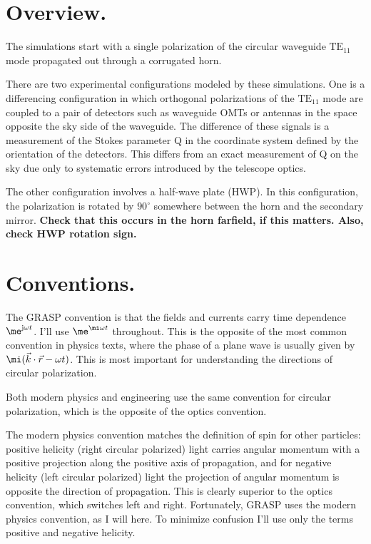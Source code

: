 \documentclass[10pt,english]{article}
\begin{document}
\section*{Overview.}

The simulations start with a single polarization of the circular waveguide $\text{TE}_{11}$ mode propagated out through a corrugated horn.

There are two experimental configurations modeled by these simulations. One is a differencing configuration in which orthogonal polarizations of the $\text{TE}_{11}$ mode are coupled to a pair of detectors such as waveguide OMTs or antennas in the space opposite the sky side of the waveguide. The difference of these signals is a measurement of the Stokes parameter Q in the coordinate system defined by the orientation of the detectors. This differs from an exact measurement of Q on the sky due only to systematic errors introduced by the telescope optics.

The other configuration involves a half-wave plate (HWP). In this configuration, the polarization is rotated by $90^{\circ}$ somewhere between the horn and the secondary mirror. \textbf{Check that this occurs in the horn farfield, if this matters. Also, check HWP rotation sign.}

\section*{Conventions.}

The GRASP convention is that the fields and currents carry time dependence $\me^{\mathrm{j} \omega t}$. I'll use $\me^{\mi \omega t}$ throughout. This is the opposite of the most common convention in physics texts, where the phase of a plane wave is usually given by $\mi (\vec{k} \cdot \vec{r} - \omega t)$. This is most important for understanding the directions of circular polarization.

Both modern physics and engineering use the same convention for circular polarization, which is the opposite of the optics convention. 

The modern physics convention matches the definition of spin for other particles: positive helicity (right circular polarized) light carries angular momentum with a positive projection along the positive axis of propagation, and for negative helicity (left circular polarized) light the projection of angular momentum is opposite the direction of propagation. This is clearly superior to the optics convention, which switches left and right. Fortunately, GRASP uses the modern physics convention, as I will here. To minimize confusion I'll use only the terms positive and negative helicity.
\end{document}
